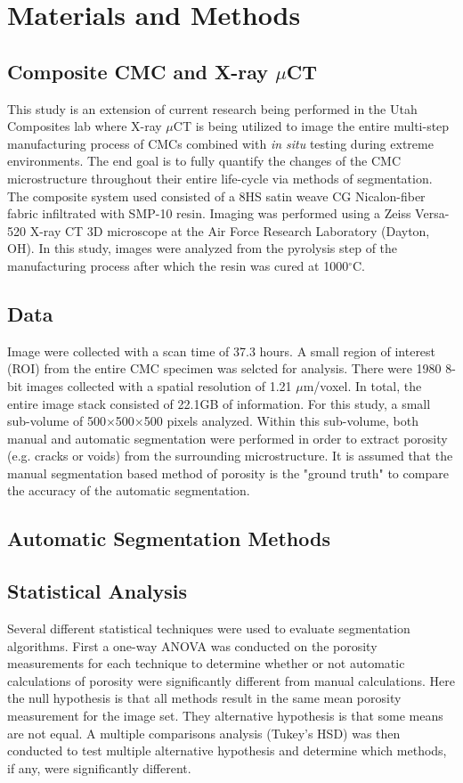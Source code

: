 \documentclass[11pt, twocolumn]{article}
\begin{document}
\section{Materials and Methods}

\subsection{Composite CMC and X-ray $\mu$CT}
This study is an extension of current research being performed in the Utah Composites lab where X-ray $\mu$CT is being utilized to image the entire multi-step manufacturing process of CMCs combined with \textit{in situ} testing during extreme environments. The end goal is to fully quantify the changes of the CMC microstructure throughout their entire life-cycle via methods of segmentation. The composite system used consisted of a 8HS satin weave CG Nicalon-fiber fabric infiltrated with SMP-10 resin. Imaging was performed using a Zeiss Versa-520 X-ray CT 3D microscope at the Air Force Research Laboratory (Dayton, OH). In this study, images were analyzed from the pyrolysis step of the manufacturing process after which the resin was cured at 1000$^{\circ}$C.

\subsection{Data}
Image were collected with a scan time of 37.3 hours. A small region of interest (ROI) from the entire CMC specimen was selcted for analysis. There were 1980 8-bit images collected with a spatial resolution of 1.21 $\mu$m/voxel. In total, the entire image stack consisted of 22.1GB of information. For this study, a small sub-volume of 500$\times$500$\times$500 pixels analyzed. Within this sub-volume, both manual and automatic segmentation were performed in order to extract porosity (e.g. cracks or voids) from the surrounding microstructure. It is assumed that the manual segmentation based method of porosity is the "ground truth" to compare the accuracy of the automatic segmentation.

\subsection{Automatic Segmentation Methods}


\subsection{Statistical Analysis} 
Several different statistical techniques were used to evaluate segmentation algorithms. First a one-way ANOVA was conducted on the porosity measurements for each technique to determine whether or not automatic calculations of porosity were significantly different from manual calculations. Here the null hypothesis is that all methods result in the same mean porosity measurement for the image set. They alternative hypothesis is that some means are not equal. A multiple comparisons analysis (Tukey's HSD) was then conducted to test multiple alternative hypothesis and determine which methods, if any, were significantly different.\\
\end{document}
